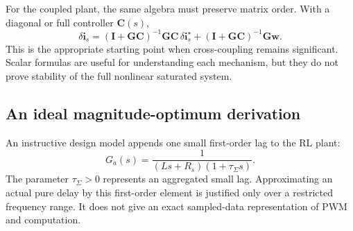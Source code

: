 For the coupled plant, the same algebra must preserve matrix order. With a diagonal or full controller $\bm C(s)$,
\begin{equation}
 \delta\bm i_s=(\bm I+\bm G\bm C)^{-1}\bm G\bm C\,
                \delta\bm i_s^\star
 + (\bm I+\bm G\bm C)^{-1}\bm G\bm w.
 \label{eq:control-matrix-feedback}
\end{equation}
This is the appropriate starting point when cross-coupling remains significant. Scalar formulas are useful for understanding each mechanism, but they do not prove stability of the full nonlinear saturated system.

\subsection{An ideal magnitude-optimum derivation}

An instructive design model appends one small first-order lag to the RL plant:
\begin{equation}
 G_a(s)=\frac{1}{(Ls+R_s)(1+\tau_\Sigma s)}.
\end{equation}
The parameter $\tau_\Sigma>0$ represents an aggregated small lag. Approximating an actual pure delay by this first-order element is justified only over a restricted frequency range. It does not give an exact sampled-data representation of PWM and computation.


